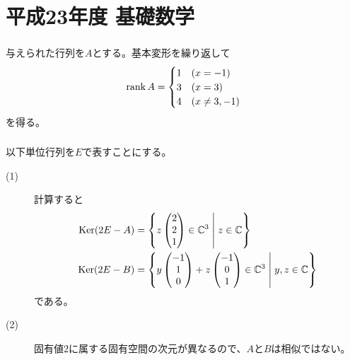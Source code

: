 \section{平成23年度 基礎数学}

\subsubsection{}%
\begin{sol}
  与えられた行列を$A$とする。基本変形を繰り返して
  \[
  \operatorname{rank} A = \begin{cases}
  1 &(x= -1) \\
  3 &(x=3) \\
  4 &(x \neq 3, -1)
\end{cases}
  \]
  を得る。
\end{sol}

\newpage


\subsubsection{}%
\begin{sol} 以下単位行列を$E$で表すことにする。
  \begin{description}
    \item[(1)] 計算すると
    \begin{align*}
      \operatorname{Ker} (2E - A) &= \left\{  z \begin{pmatrix} 2 \\ 2 \\ 1 \end{pmatrix} \in {\mathbb C}^3  \mathrel{} \middle| \mathrel{}  z \in {\mathbb C} \right\} \\
        \operatorname{Ker} (2E - B) &= \left\{  y\begin{pmatrix} -1\\ 1 \\0 \end{pmatrix}+  z \begin{pmatrix} -1 \\ 0 \\ 1 \end{pmatrix} \in {\mathbb C}^3  \mathrel{} \middle| \mathrel{} y, z \in {\mathbb C} \right\}
    \end{align*}
    である。
    \item[(2)] 固有値$2$に属する固有空間の次元が異なるので、$A$と$B$は相似ではない。
  \end{description}
\end{sol}


